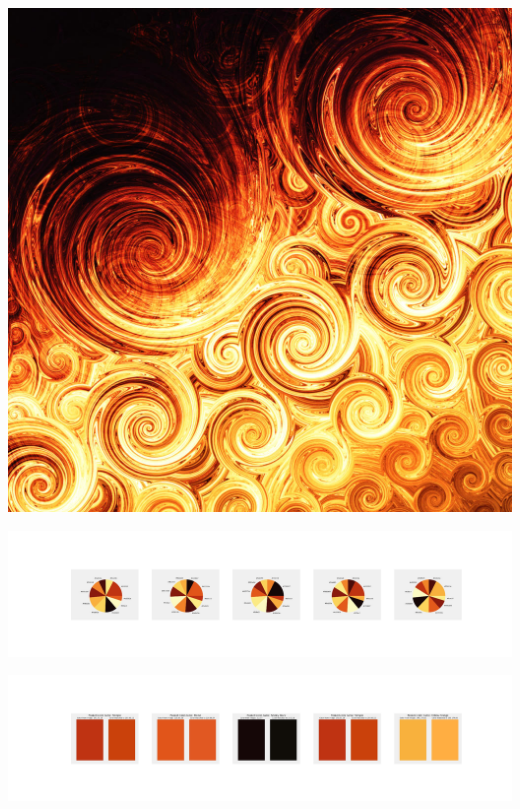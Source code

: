 \documentclass[11pt]{article}
\begin{document}
\begin{landscape}
    \begin{center}
    \includegraphics[width=\textwidth]{./nbimg/file (334).jpg}
    \end{center}

    \begin{center}
    \includegraphics[width=250mm]{./nbimg/pie-261.jpg}
    \end{center}

    \begin{center}
    \includegraphics[width=250mm]{./nbimg/peak-261.jpg}
    \end{center}
    


\end{landscape}
\end{document}
